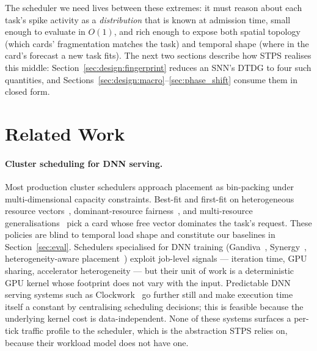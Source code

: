 \documentclass[letterpaper,twocolumn,10pt]{article}
\begin{document}
The scheduler we need lives between these extremes: it must reason about each task's spike activity as a \emph{distribution} that is known at admission time, small enough to evaluate in $O(1)$, and rich enough to expose both spatial topology (which cards' fragmentation matches the task) and temporal shape (where in the card's forecast a new task fits). The next two sections describe how STPS realises this middle: Section~\ref{sec:design:fingerprint} reduces an SNN's DTDG to four such quantities, and Sections~\ref{sec:design:macro}--\ref{sec:phase_shift} consume them in closed form.

\section{Related Work}
\label{sec:related}

\paragraph{Cluster scheduling for DNN serving.}
Most production cluster schedulers approach placement as bin-packing under multi-dimensional capacity constraints. Best-fit and first-fit on heterogeneous resource vectors~\cite{panigrahy2011heuristics, lee2011validating}, dominant-resource fairness~\cite{ghodsi2011dominant}, and multi-resource generalisations~\cite{grandl2014multi} pick a card whose free vector dominates the task's request. These policies are blind to temporal load shape and constitute our baselines in Section~\ref{sec:eval}. Schedulers specialised for DNN training (Gandiva~\cite{xiao2018gandiva}, Synergy~\cite{mohan2022looking}, heterogeneity-aware placement~\cite{narayanan2020heterogeneity}) exploit job-level signals --- iteration time, GPU sharing, accelerator heterogeneity --- but their unit of work is a deterministic GPU kernel whose footprint does not vary with the input. Predictable DNN serving systems such as Clockwork~\cite{gujarati2020clockwork} go further still and make execution time itself a constant by centralising scheduling decisions; this is feasible because the underlying kernel cost is data-independent. None of these systems surfaces a per-tick traffic profile to the scheduler, which is the abstraction STPS relies on, because their workload model does not have one.
\end{document}
